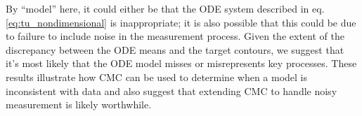  By ``model'' here, it could either be that the ODE system described in eq. \eqref{eq:tu_nondimensional} is inappropriate; it is also possible that this could be due to failure to include noise in the measurement process. Given the extent of the discrepancy between the ODE means and the target contours, we suggest that it's most likely that the ODE model misses or misrepresents key processes. These results illustrate how CMC can be used to determine when a model is inconsistent with data and also suggest that extending CMC to handle noisy measurement is likely worthwhile.


